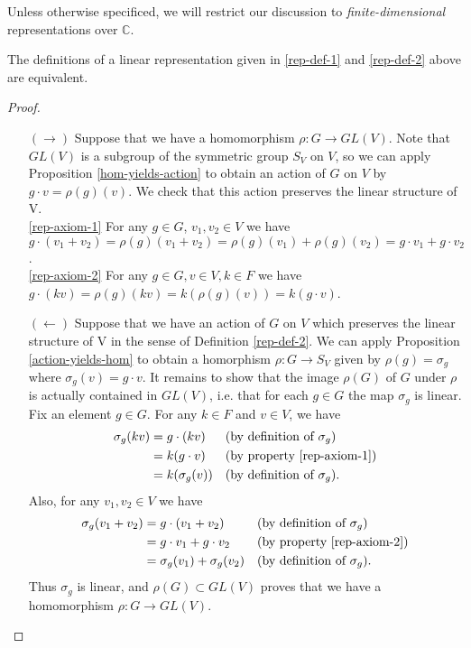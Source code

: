  \begin{note}
 Unless otherwise specificed, we will restrict our discussion to \textit{finite-dimensional} representations over $\mathbb{C}$.
 \end{note}
 
 
 \begin{prop}
The definitions of a linear representation given in \ref{rep-def-1} and \ref{rep-def-2} above are equivalent.
 \end{prop}
 \begin{proof}
 \begin{itemize}
\item[$(\rightarrow)$]  Suppose that we have a homomorphism $\rho \colon G \to GL(V)$.  Note that $GL(V)$ is a subgroup of the symmetric group $S_V$ on $V$, so we can apply Proposition \ref{hom-yields-action} to obtain an action of $G$ on $V$ by $g \cdot v = \rho(g)(v)$.  We check that this action preserves the linear structure of V.
\\\ref{rep-axiom-1} \quad For any $g \in G$, $v_1, v_2 \in V$ we have $g \cdot (v_1 +  v_2) = \rho(g) (v_1 + v_2) = \rho(g)(v_1) + \rho(g)(v_2)= g \cdot v_1 + g \cdot v_2$.
\\\ref{rep-axiom-2} \quad For any $g \in G, v \in V, k \in F$ we have $g \cdot (kv) = \rho(g)(kv) = k (\rho(g)(v)) = k (g \cdot v)$.
\item[$(\leftarrow)$] Suppose that we have an action of $G$ on $V$ which preserves the linear structure of V in the sense of Definition \ref{rep-def-2}.  We can apply Proposition \ref{action-yields-hom} to obtain a homorphism $\rho \colon G \to S_V$ given by $\rho(g) = \sigma_g$ where $\sigma_g(v) = g \cdot v $.  It remains to show that the image $\rho(G)$ of $G$ under $\rho$ is actually contained in $GL(V)$, i.e. that for each $g \in G$ the map $\sigma_g$ is linear.  Fix an element $g \in G$. For any $k \in F$ and $v \in V$, we have
\begin{align*}
\sigma_g (kv) &= g \cdot (kv) && \text{(by definition of $\sigma_g$)} \\
		&= k (g \cdot v) && \text{(by property \ref{rep-axiom-1})} \\
		&= k (\sigma_g (v)) && \text{(by definition of $\sigma_g$)}.
\end{align*}
Also, for any $v_1, v_2 \in V$ we have
\begin{align*}
\sigma_g (v_1 + v_2) &= g \cdot (v_1 + v_2) && \text{(by definition of $\sigma_g$)} \\
		&= g \cdot v_1 + g \cdot v_2 && \text{(by property \ref{rep-axiom-2})} \\
		&= \sigma_g(v_1) + \sigma_g(v_2) && \text{(by definition of $\sigma_g$)}.
\end{align*}
Thus $\sigma_g$ is linear, and $\rho(G) \subset GL(V)$ proves that we  have a homomorphism $\rho \colon G \to GL(V)$.

\end{itemize}
 \end{proof}
